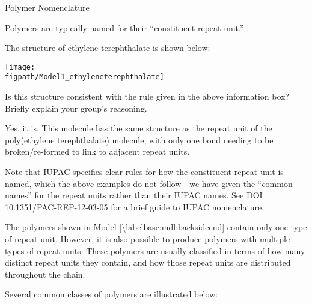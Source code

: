 \begin{activity}{Polymer Nomenclature}
\begin{ctqs}
\begin{enumerate}
		\end{enumerate}

\end{ctqs}

\begin{infobox}
	Polymers are typically named for their ``constituent repeat unit.''
\end{infobox}

\begin{ctqs}

	\question The structure of ethylene terephthalate is shown below:
	
		\centerline{\texttt{[image: \\figpath/Model1\_ethyleneterephthalate]}}
		
		Is this structure consistent with the rule given in the above information box?  Briefly explain your group's reasoning.
		
		\begin{solution}[0.75in]
			Yes, it is.  This molecule has the same structure as the repeat unit of the poly(ethylene terephthalate) molecule, with only one bond needing to be broken/re-formed to link to adjacent repeat units.
			
			Note that IUPAC specifies clear rules for how the constituent repeat unit is named, which the above examples do not follow - we have given the ``common names'' for the repeat units rather than their IUPAC names.  See DOI 10.1351/PAC-REP-12-03-05 for a brief guide to IUPAC nomenclature.
		\end{solution}

\end{ctqs}


\clearpage


\begin{model}[Composition]
\label{\labelbase:mdl:composition}

	The polymers shown in Model \ref{\labelbase:mdl:backsideend} contain only one type of repeat unit.  However, it is also possible to produce polymers with multiple types of repeat units.  These polymers are usually classified in terms of how many distinct repeat units they contain, and how those repeat units are distributed throughout the chain.
	
	Several common classes of polymers are illustrated below:
	

\end{model}
\end{activity}
